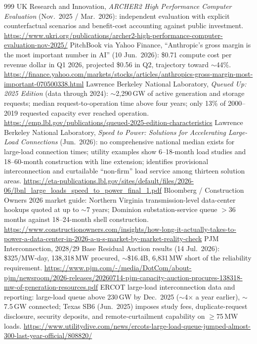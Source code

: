 \begin{thebibliography}{999}
 UK Research and Innovation, \emph{ARCHER2 High Performance Computer Evaluation} (Nov.\ 2025 / Mar.\ 2026): independent evaluation with explicit counterfactual scenarios and benefit-cost accounting against public investment. \url{https://www.ukri.org/publications/archer2-high-performance-computer-evaluation-nov-2025/}
 PitchBook via Yahoo Finance, ``Anthropic's gross margin is the most important number in AI'' (10 Jun.\ 2026): \$0.71 compute cost per revenue dollar in Q1 2026, projected \$0.56 in Q2, trajectory toward $\sim$44\%. \url{https://finance.yahoo.com/markets/stocks/articles/anthropics-gross-margin-most-important-070500338.html}
 Lawrence Berkeley National Laboratory, \emph{Queued Up: 2025 Edition} (data through 2024): $\sim$2,290\,GW of active generation and storage requests; median request-to-operation time above four years; only 13\% of 2000--2019 requested capacity ever reached operation. \url{https://emp.lbl.gov/publications/queued-2025-edition-characteristics}
 Lawrence Berkeley National Laboratory, \emph{Speed to Power: Solutions for Accelerating Large-Load Connections} (Jun.\ 2026): no comprehensive national median exists for large-load connection times; utility examples show 6--18-month load studies and 18--60-month construction with line extension; identifies provisional interconnection and curtailable ``non-firm'' load service among thirteen solution areas. \url{https://eta-publications.lbl.gov/sites/default/files/2026-06/lbnl_large_loads_speed_to_power_final_1.pdf}
 Bloomberg / Construction Owners 2026 market guide: Northern Virginia transmission-level data-center hookups quoted at up to $\sim$7 years; Dominion substation-service queue $>$36 months against 18--24-month shell construction. \url{https://www.constructionowners.com/insights/how-long-it-actually-takes-to-power-a-data-center-in-2026-a-u-s-market-by-market-reality-check}
 PJM Interconnection, 2028/29 Base Residual Auction results (14 Jul.\ 2026): \$325/MW-day, 138,318\,MW procured, $\sim$\$16.4B, 6,831\,MW short of the reliability requirement. \url{https://www.pjm.com/-/media/DotCom/about-pjm/newsroom/2026-releases/20260714-pjm-capacity-auction-procures-138318-mw-of-generation-resources.pdf}
 ERCOT large-load interconnection data and reporting: large-load queue above 230\,GW by Dec.\ 2025 ($\sim$4$\times$ a year earlier), $\sim$7.5\,GW connected; Texas SB6 (Jun.\ 2025) imposes study fees, duplicate-request disclosure, security deposits, and remote-curtailment capability on $\ge$75\,MW loads. \url{https://www.utilitydive.com/news/ercots-large-load-queue-jumped-almost-300-last-year-official/808820/}

\end{thebibliography}
